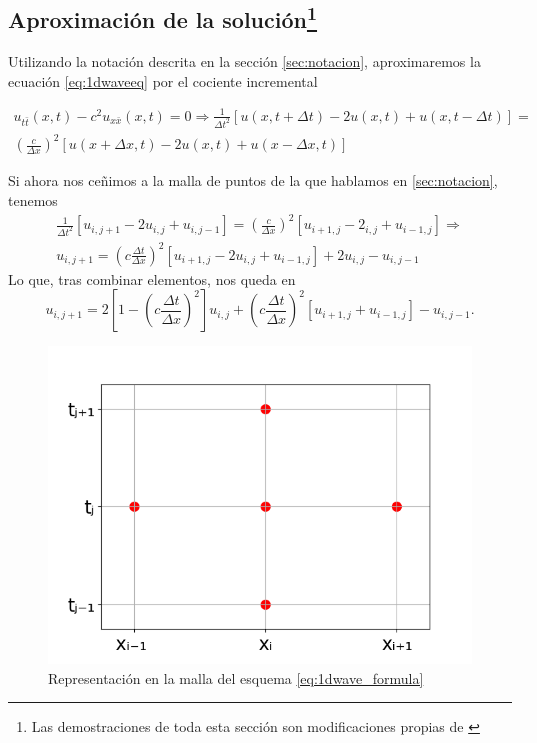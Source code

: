 \subsection[Aproximación de la solución]{Aproximación de la solución\footnote{Las demostraciones de toda esta sección son modificaciones propias de \cite{anummeth}}}

Utilizando la notación descrita en la sección \ref{sec:notacion}, aproximaremos la ecuación \ref{eq:1dwaveeq} por el cociente incremental 

\begin{equation*}
	\begin{split}
	u_{t\bar t}(x,t) - c^2u_{x\bar{x}}(x,t) = 0 \Rightarrow \frac{1}{\Delta t^2}[u(x,t + \Delta t)-2u(x,t)+u(x, t - \Delta t)]  = \\ \left(\frac{c}{\Delta x}\right)^2[u(x+\Delta x,t)-2u(x,t)+u(x-\Delta x, t)]
	\end{split}
\end{equation*}

Si ahora nos ceñimos a la malla de puntos de la que hablamos en \ref{sec:notacion}, tenemos
\begin{equation*}
	\begin{split}
	\frac{1}{\Delta t^2}[u_{i,j+1}-2u_{i,j}+u_{i,j-1}] = \left(\frac{c}{\Delta x}\right)^2[u_{i+1,j}-2_{i,j}+u_{i-1,j}] \Rightarrow \\
	u_{i,j+1} = \left(c\frac{\Delta t}{\Delta x}\right)^2[u_{i+1,j}-2u_{i,j}+u_{i-1,j}] + 2u_{i,j} - u_{i,j-1}	
	\end{split}
\end{equation*}
Lo que, tras combinar elementos, nos queda en
\begin{equation}
	\label{eq:1dwave_formula}
	u_{i,j+1} =  2\left[1 - \left(c\frac{\Delta t}{\Delta x}\right)^2\right]u_{i,j} + \left(c\frac{\Delta t}{\Delta x}\right)^2[u_{i+1,j} + u_{i-1,j}] - u_{i,j-1}.
\end{equation}


\begin{figure}[h]
	\centering
	\includegraphics[scale=0.5]{./Imagenes/Bitmap/1dwave.png}
	\caption{Representación en la malla del esquema \ref{eq:1dwave_formula}}
\end{figure}

